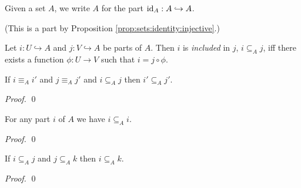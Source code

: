 \begin{df}
  Given a set $A$, we write $A$ for the part $\mathrm{id}_{A} : A \hookrightarrow A$.
\end{df}

(This is a part by Proposition \ref{prop:sets:identity:injective}.)

\begin{df}[Inclusion]
 Let $i : U \hookrightarrow A$ and $j : V \hookrightarrow A$ be parts of $A$.
 Then $i$ is \emph{included} in $j$, $i \subseteq_A j$, iff there exists a
 function $\phi : U \rightarrow V$ such that $i = j \circ \phi$.
\end{df}

\begin{prop}
  If $i \equiv_A i'$ and $j \equiv_A j'$ and $i \subseteq_A j$ then $i' \subseteq_A j'$.
\end{prop}

\begin{proof}
  \pf
  \qed
\end{proof}

\begin{prop}
  For any part $i$ of $A$ we have $i \subseteq_A i$.
\end{prop}

\begin{proof}
  \pf
  \qed
\end{proof}

\begin{prop}
  If $i \subseteq_A j$ and $j \subseteq_A k$ then $i \subseteq_A k$.
\end{prop}

\begin{proof}
  \pf
  \qed
\end{proof}

